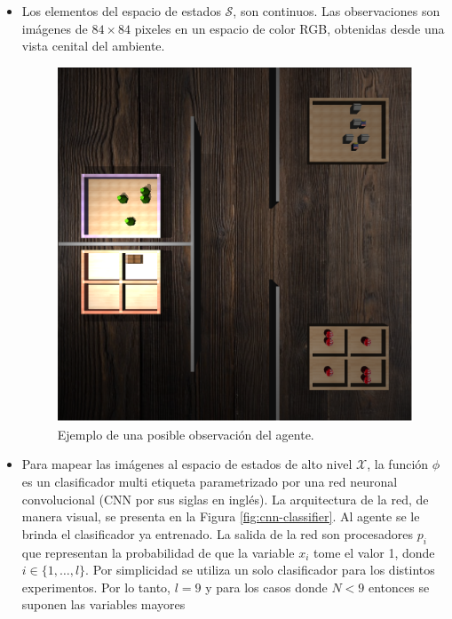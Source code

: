 \begin{itemize}
    \item Los elementos del espacio de estados $\mathcal{S}$, son continuos.
    Las observaciones son imágenes de $84\times 84$ pixeles en un espacio de color RGB, obtenidas desde una vista cenital del ambiente.
    
    \begin{figure}[H]
        \centering
        \includegraphics[scale=0.2]{Chapter5/Figs/obs_example.png}
        \caption{Ejemplo de una posible observación del agente.}
        \label{fig:obs-example-lights}
    \end{figure}
    \item Para mapear las imágenes al espacio de estados de alto nivel $\mathcal{X}$, la función $\phi$ es un clasificador multi etiqueta
    parametrizado por una red neuronal convolucional \cite{Goodfellow-et-al-2016} (CNN por sus siglas en inglés). La arquitectura de la red, de manera visual, se presenta en la Figura \ref{fig:cnn-classifier}. Al agente se le brinda el clasificador ya entrenado.
    La salida de la red son procesadores $p_i$ que
    representan la probabilidad de que la variable $x_i$ tome el valor 1, donde
    $i \in \{1, \dots, l\}$. Por simplicidad se utiliza un solo
    clasificador para los distintos experimentos. Por lo tanto, $l = 9$ y
    para los casos donde $N < 9$ entonces se suponen las variables mayores

\end{itemize}
